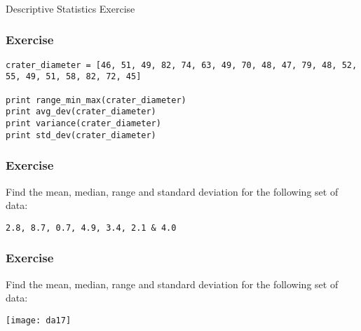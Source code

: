 \begin{frame}[fragile]\frametitle{}
\begin{center}
{\Large Descriptive Statistics Exercise}
\end{center}
\end{frame}

\begin{frame}[fragile]\frametitle{Exercise}	
\begin{lstlisting}
crater_diameter = [46, 51, 49, 82, 74, 63, 49, 70, 48, 47, 79, 48, 52, 55, 49, 51, 58, 82, 72, 45]
 
print range_min_max(crater_diameter)
print avg_dev(crater_diameter)
print variance(crater_diameter)
print std_dev(crater_diameter)
\end{lstlisting}
\end{frame}


\begin{frame}[fragile]\frametitle{Exercise}	
Find the mean, median, range and standard deviation for the following set of data:

\lstinline|2.8, 8.7, 0.7, 4.9, 3.4, 2.1 & 4.0|
\end{frame}

\begin{frame}[fragile]\frametitle{Exercise}	
Find the mean, median, range and standard deviation for the following set of data:

\begin{center}
\texttt{[image: da17]}
\end{center}
\end{frame}

